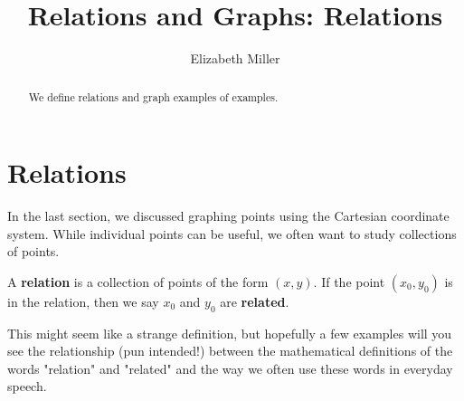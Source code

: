 \documentclass{ximera}
\author{Elizabeth Miller}
\title{Relations and Graphs: Relations}
\begin{document}
\begin{abstract}
We define relations and graph examples of examples.  %
\end{abstract}
\maketitle


\section{Relations} 
In the last section, we discussed graphing points using the Cartesian coordinate system. While individual points can be useful, we often want to study collections of points.

\begin{tcolorbox}
\begin{definition}
A \textbf{relation} is a collection of points of the form $(x,y)$.  If the point $(x_0,y_0)$ is in the relation, then we say $x_0$ and $y_0$ are \textbf{related}.
\end{definition}
\end{tcolorbox}

This might seem like a strange definition, but hopefully a few examples will you see the relationship (pun intended!) between the mathematical definitions of the words "relation" and "related" and the way we often use these words in everyday speech.
\end{document}
